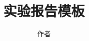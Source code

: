 \documentclass{article}
\title{实验报告模板}
\author{作者}
\newenvironment{codedisplay}[2]
{
    \begin{multicols}{3}
        
    \end{multicols} 
}
\begin{document}
\begin{codedisplay}{[x86masm]Assembler}{code/Lab6.4 copy.asm}

\end{codedisplay}
\end{document}
